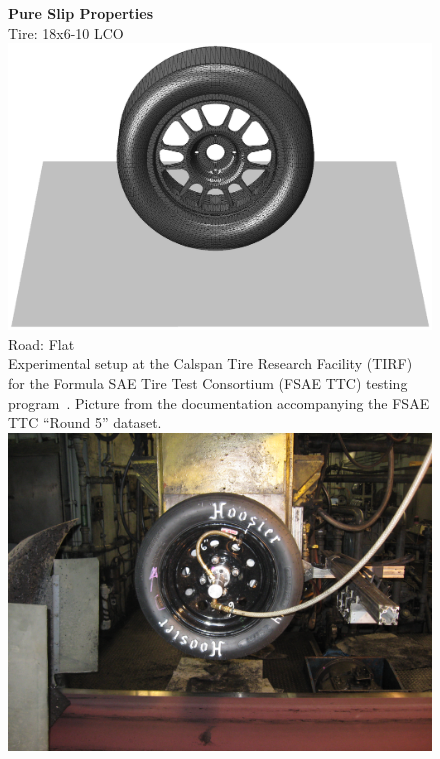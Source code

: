 \begin{figure}[htb]
  \centering
  \begin{minipage}[c]{0.70\linewidth}
    \raggedleft
  \end{minipage}%
  \hfill
  \begin{minipage}[c]{0.29\linewidth}
    \centering
    \textbf{Pure Slip Properties} \\[0.4em]
    Tire: \Hoosier{} 18x6-10 LCO \\[0.4em]
    \includegraphics[width=1.0\linewidth, trim={13.5cm 4.25cm 11.5cm 6.0cm}, clip]{./figures/appendix_3/render_hoosier}
    Road: Flat \\[4.0em]
    Experimental setup at the Calspan Tire Research Facility (TIRF) for the Formula SAE Tire Test Consortium (FSAE TTC) testing program~\cite{kasprzak2006formula}. Picture from the documentation accompanying the FSAE TTC ``Round 5'' dataset. \\[0.4em]
    \includegraphics[width=0.9\linewidth]{./figures/appendix_3/hoosier_calspan}

\end{minipage}
\end{figure}
